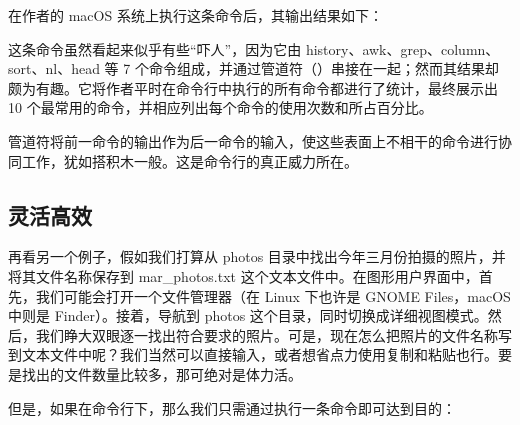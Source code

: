 \documentclass[]{ctexbook}
\newenvironment{Shaded}{\begin{snugshade}}{\end{snugshade}}
\newcommand{\ExtensionTok}[1]{#1}
\newcommand{\FunctionTok}[1]{\textcolor[rgb]{0.00,0.00,0.00}{#1}}
\newcommand{\KeywordTok}[1]{\textcolor[rgb]{0.13,0.29,0.53}{\textbf{#1}}}
\newcommand{\NormalTok}[1]{#1}
\newcommand{\OperatorTok}[1]{\textcolor[rgb]{0.81,0.36,0.00}{\textbf{#1}}}
\newcommand{\StringTok}[1]{\textcolor[rgb]{0.31,0.60,0.02}{#1}}
\begin{document}
在作者的 macOS 系统上执行这条命令后，其输出结果如下：

\begin{Shaded}
\end{Shaded}

这条命令虽然看起来似乎有些``吓人''，因为它由 history、awk、grep、column、sort、nl、head 等 7 个命令组成，并通过管道符（\textbar{}）串接在一起；然而其结果却颇为有趣。它将作者平时在命令行中执行的所有命令都进行了统计，最终展示出 10 个最常用的命令，并相应列出每个命令的使用次数和所占百分比。

管道符将前一命令的输出作为后一命令的输入，使这些表面上不相干的命令进行协同工作，犹如搭积木一般。这是命令行的真正威力所在。

\hypertarget{ux7075ux6d3bux9ad8ux6548}{%
\subsection{灵活高效}\label{ux7075ux6d3bux9ad8ux6548}}

再看另一个例子，假如我们打算从 photos 目录中找出今年三月份拍摄的照片，并将其文件名称保存到 mar\_photos.txt 这个文本文件中。在图形用户界面中，首先，我们可能会打开一个文件管理器（在 Linux 下也许是 GNOME Files，macOS 中则是 Finder）。接着，导航到 photos 这个目录，同时切换成详细视图模式。然后，我们睁大双眼逐一找出符合要求的照片。可是，现在怎么把照片的文件名称写到文本文件中呢？我们当然可以直接输入，或者想省点力使用复制和粘贴也行。要是找出的文件数量比较多，那可绝对是体力活。

但是，如果在命令行下，那么我们只需通过执行一条命令即可达到目的：

\begin{Shaded}
\end{Shaded}
\end{document}

